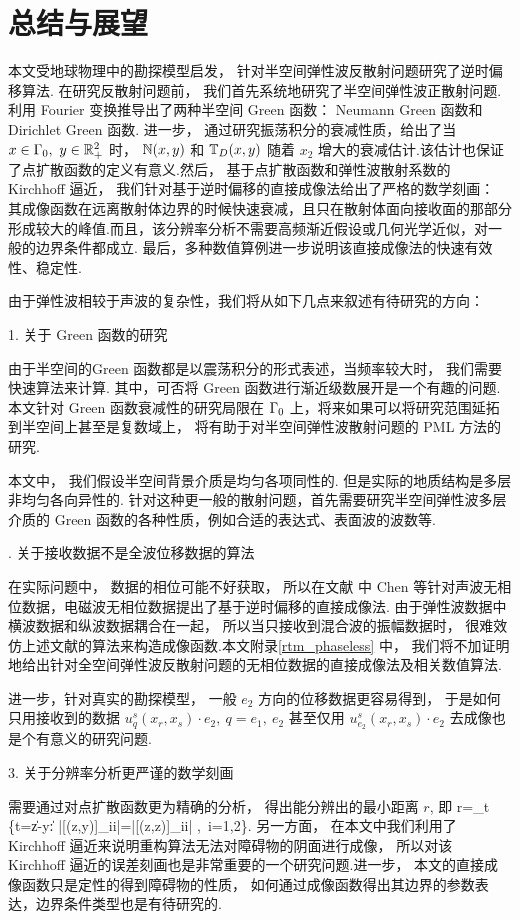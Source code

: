 \chapter{总结与展望} \label{chap:summary}

本文受地球物理中的勘探模型启发， 针对半空间弹性波反散射问题研究了逆时偏移算法. 在研究反散射问题前， 我们首先系统地研究了半空间弹性波正散射问题.利用 Fourier 变换推导出了两种半空间 Green 函数： Neumann Green 函数和 Dirichlet Green 函数. 进一步， 通过研究振荡积分的衰减性质，给出了当 $x\in \Gamma_0, \ y\in \mathbb{R}^2_+$ 时， $\mathbb{N}(x,y)$ 和 $\mathbb{T}_D(x,y)$ 随着 $x_2$ 增大的衰减估计.该估计也保证了点扩散函数的定义有意义.然后， 基于点扩散函数和弹性波散射系数的 Kirchhoff 逼近， 我们针对基于逆时偏移的直接成像法给出了严格的数学刻画： 其成像函数在远离散射体边界的时候快速衰减，且只在散射体面向接收面的那部分形成较大的峰值.而且，该分辨率分析不需要高频渐近假设或几何光学近似，对一般的边界条件都成立. 最后，多种数值算例进一步说明该直接成像法的快速有效性、稳定性.

由于弹性波相较于声波的复杂性，我们将从如下几点来叙述有待研究的方向：

1. 关于 Green 函数的研究

由于半空间的Green 函数都是以震荡积分的形式表述，当频率较大时， 我们需要快速算法来计算. 其中，可否将 Green 函数进行渐近级数展开是一个有趣的问题.本文针对 Green 函数衰减性的研究局限在 $\Gamma_0$ 上，将来如果可以将研究范围延拓到半空间上甚至是复数域上， 将有助于对半空间弹性波散射问题的 PML 方法的研究.

 本文中， 我们假设半空间背景介质是均匀各项同性的. 但是实际的地质结构是多层非均匀各向异性的. 针对这种更一般的散射问题，首先需要研究半空间弹性波多层介质的 Green 函数的各种性质，例如合适的表达式、表面波的波数等. 

. 关于接收数据不是全波位移数据的算法

在实际问题中， 数据的相位可能不好获取， 所以在文献 \cite{chen2016direct,chen2017direct,chen2017phaseless} 中 Chen 等针对声波无相位数据，电磁波无相位数据提出了基于逆时偏移的直接成像法. 由于弹性波数据中横波数据和纵波数据耦合在一起， 所以当只接收到混合波的振幅数据时， 很难效仿上述文献的算法来构造成像函数.本文附录\ref{rtm_phaseless} 中， 我们将不加证明地给出针对全空间弹性波反散射问题的无相位数据的直接成像法及相关数值算法.

进一步，针对真实的勘探模型， 一般 $e_2$ 方向的位移数据更容易得到， 于是如何只用接收到的数据 $u^s_q(x_r,x_s)\cdot e_2, \ q=e_1, \ e_2$ 甚至仅用 $u^s_{e_2}(x_r,x_s)\cdot e_2$ 去成像也是个有意义的研究问题.

\bigskip

3. 关于分辨率分析更严谨的数学刻画

需要通过对点扩散函数更为精确的分析， 得出能分辨出的最小距离 $r$, 即
\ben
r=\inf_{t} \{t=\|z-y\| : |[\J(z,y)]_{ii}|=|[\J(z,z)]_{ii}| ,\ i=1,2\}.
\een
另一方面， 在本文中我们利用了 Kirchhoff 逼近来说明重构算法无法对障碍物的阴面进行成像， 所以对该 Kirchhoff 逼近的误差刻画也是非常重要的一个研究问题.进一步， 本文的直接成像函数只是定性的得到障碍物的性质， 如何通过成像函数得出其边界的参数表达，边界条件类型也是有待研究的.

